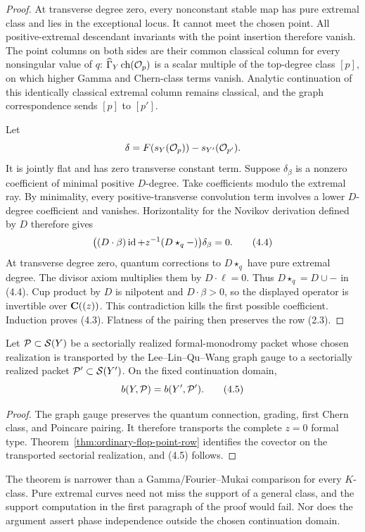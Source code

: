 \begin{proof}
At transverse degree zero, every nonconstant stable map has pure extremal
class and lies in the exceptional locus.  It cannot meet the chosen point.
All positive-extremal descendant invariants with the point insertion
therefore vanish.  The point columns on both sides are their common
classical column for every nonsingular value of \(q\):
\(\widehat{\Gamma}_Y\operatorname{ch}(\mathcal O_p)\) is a scalar multiple of the top-degree
class \([p]\), on which higher Gamma and Chern-class terms vanish.  Analytic
continuation of this identically classical extremal column remains
classical, and the graph correspondence sends \([p]\) to \([p']\).

Let
\[
 \delta=F(s_Y(\mathcal O_p))-s_{Y'}(\mathcal O_{p'}).
\]
It is jointly flat and has zero transverse constant term.  Suppose
\(\delta_\beta\) is a nonzero coefficient of minimal positive \(D\)-degree.
Take coefficients modulo the extremal ray.  By minimality, every
positive-transverse convolution term involves a lower \(D\)-degree
coefficient and vanishes.  Horizontality for the Novikov derivation defined
by \(D\) therefore gives
\[
 \bigl((D\cdot\beta)\operatorname{id}+z^{-1}(D\star_q-)\bigr)
 \delta_\beta=0.                                           \tag{4.4}
\]
At transverse degree zero, quantum corrections to \(D\star_q\) have pure
extremal degree.  The divisor axiom multiplies them by
\(D\cdot\ell=0\).  Thus \(D\star_q=D\cup-\) in (4.4).  Cup product by \(D\)
is nilpotent and \(D\cdot\beta>0\), so the displayed operator is invertible
over \(\mathbf C((z))\).  This contradiction kills the first possible coefficient.
Induction proves (4.3).  Flatness of the pairing then preserves the row
(2.3).
\end{proof}

\begin{corollary}
\label{cor:ordinary-flop-packet}
Let \(\mathcal P\subset\mathcal S(Y)\) be a sectorially realized formal-monodromy
packet whose chosen realization is transported by the Lee--Lin--Qu--Wang
graph gauge to a sectorially realized packet
\(\mathcal P'\subset\mathcal S(Y')\).  On the fixed continuation domain,
\[
 b(Y,\mathcal P)=b(Y',\mathcal P').                                      \tag{4.5}
\]
\end{corollary}

\begin{proof}
The graph gauge preserves the quantum connection, grading, first Chern class,
and Poincare pairing.  It therefore transports the complete \(z=0\) formal
type.  Theorem~\ref{thm:ordinary-flop-point-row} identifies the covector on
the transported sectorial realization, and (4.5) follows.
\end{proof}

The theorem is narrower than a Gamma/Fourier--Mukai comparison for every
\(K\)-class.  Pure extremal curves need not miss the support of a general
class, and the support computation in the first paragraph of the proof would
fail.  Nor does the argument assert phase independence outside the chosen
continuation domain.
